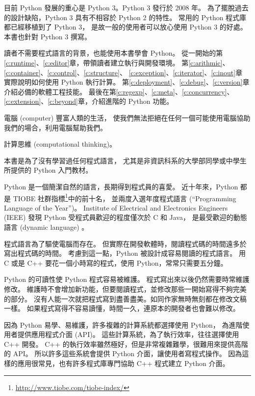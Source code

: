 \documentclass[a4paper,12pt]{book}
\theoremstyle{definition}
\begin{document}
目前 Python 發展的重心是 Python 3。Python 3 發行於 2008 年。
為了擺脫過去的設計缺陷，Python 3 具有不相容於 Python 2 的特性。
常用的 Python 程式庫都已經移植到了 Python 3，
是故一般的使用者可以放心使用 Python 3 的好處。
本書也針對 Python 3 撰寫。

%
%

讀者不需要程式語言的背景，也能使用本書學會 Python。
從一開始的第\ref{c:runtime}、\ref{c:editor}章，帶領讀者建立執行與開發環境。
第\ref{c:arithmic}、\ref{c:container}、\ref{c:control}、\ref{c:structure}、%
\ref{c:exception}、\ref{c:iterator}、\ref{c:inout}章%
實際說明如何使用 Python 執行計算。
第\ref{c:deployment}、\ref{c:debug}、\ref{c:version}章介紹必備的軟體工程技能。
最後在第\ref{c:regexp}、\ref{c:meta}、\ref{c:concurrency}、%
\ref{c:extension}、\ref{c:beyond}章，介紹進階的 Python 功能。

%
%

電腦 (computer) 豐富人類的生活，
使我們無法拒絕在任何一個可能使用電腦協助我們的場合，利用電腦幫助我們。

計算思維 (computational thinking)。

本書是為了沒有學習過任何程式語言，
尤其是非資訊科系的大學部同學或中學生所提供的 Python 入門教材。

Python 是一個簡潔自然的語言，長期得到程式員的喜愛。
近十年來，Python 都是
TIOBE 社群指標\footnote{\url{http://www.tiobe.com/tiobe-index/}}中的前十名，
並兩度入選年度程式語言 (``Programming Language of the Year'')。
Institute of Electrical and Electronics Engineers (IEEE) 發現
Python 受程式員歡迎的程度僅次於 C 和 Java，
是最受歡迎的動態語言 (dynamic language) \cite{cass_interactive:_2016}。

程式語言為了驅使電腦而存在。
但實際在開發軟體時，閱讀程式碼的時間遠多於寫出程式碼的時間。
考慮到這一點，Python 被設計成容易閱讀的程式語言。
用 C 或是 C++ 要花一個小時寫的程式，使用 Python，常常只需要五分鐘。

Python 的可讀性使 Python 程式容易被維護。
程式寫出來以後仍然需要時常維護修改。
維護時不會增加新功能，但要閱讀程式，並修改那些一開始寫得不夠完美的部分。
沒有人能一次就把程式寫到盡善盡美。如同作家無時無刻都在修改文稿一樣。
如果程式寫得不容易讀懂，時間一久，連原本的開發者也會難以修改。

因為 Python 易學、易維護，許多複雜的計算系統都選擇使用 Python，
為進階使用者提供應用程式介面 (API)。
這些計算系統，為了執行效率，往往選擇使用 C++ 開發。
C++ 的執行效率雖然極好，但是非常複雜難學，很難用來提供高階的 API。
所以許多這些系統會提供 Python 介面，讓使用者寫程式操作。
因為這樣的應用很常見，也有許多程式庫專門協助 C++ 程式建立 Python 介面。
\end{document}
